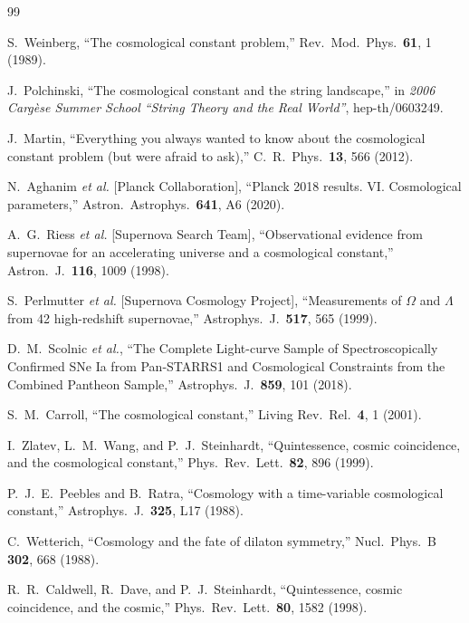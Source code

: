 \documentclass[prd,
               reprint,
               aps,
               preprintnumbers,
               nofootinbib,
               longbibliography,
               floatfix]{revtex4-2}
\begin{document}
\begin{thebibliography}{99}

S.~Weinberg,
``The cosmological constant problem,''
Rev.\ Mod.\ Phys.\ {\bf 61}, 1 (1989).

J.~Polchinski,
``The cosmological constant and the string landscape,''
in \emph{2006 Carg\`ese Summer School ``String Theory and the Real World''},
hep-th/0603249.

J.~Martin,
``Everything you always wanted to know about the cosmological constant problem (but were afraid to ask),''
C.~R.~Phys.\ {\bf 13}, 566 (2012).

N.~Aghanim {\it et al.} [Planck Collaboration],
``Planck 2018 results. VI. Cosmological parameters,''
Astron.\ Astrophys.\ {\bf 641}, A6 (2020).

A.~G.~Riess {\it et al.} [Supernova Search Team],
``Observational evidence from supernovae for an accelerating universe 
and a cosmological constant,''
Astron.\ J.\ {\bf 116}, 1009 (1998).

S.~Perlmutter {\it et al.} [Supernova Cosmology Project],
``Measurements of $\Omega$ and $\Lambda$ from 42 high-redshift supernovae,''
Astrophys.\ J.\ {\bf 517}, 565 (1999).

D.~M.~Scolnic {\it et al.},
``The Complete Light-curve Sample of Spectroscopically Confirmed SNe Ia from Pan-STARRS1 and Cosmological Constraints from the Combined Pantheon Sample,''
Astrophys.\ J.\ {\bf 859}, 101 (2018).

S.~M.~Carroll,
``The cosmological constant,''
Living Rev.\ Rel.\ {\bf 4}, 1 (2001).

I.~Zlatev, L.~M.~Wang, and P.~J.~Steinhardt,
``Quintessence, cosmic coincidence, and the cosmological constant,''
Phys.\ Rev.\ Lett.\ {\bf 82}, 896 (1999).

P.~J.~E.~Peebles and B.~Ratra,
``Cosmology with a time-variable cosmological constant,''
Astrophys.\ J.\ {\bf 325}, L17 (1988).

C.~Wetterich,
``Cosmology and the fate of dilaton symmetry,''
Nucl.\ Phys.\ B {\bf 302}, 668 (1988).

R.~R.~Caldwell, R.~Dave, and P.~J.~Steinhardt,
``Quintessence, cosmic coincidence, and the cosmic,''
Phys.\ Rev.\ Lett.\ {\bf 80}, 1582 (1998).


\end{thebibliography}
\end{document}
